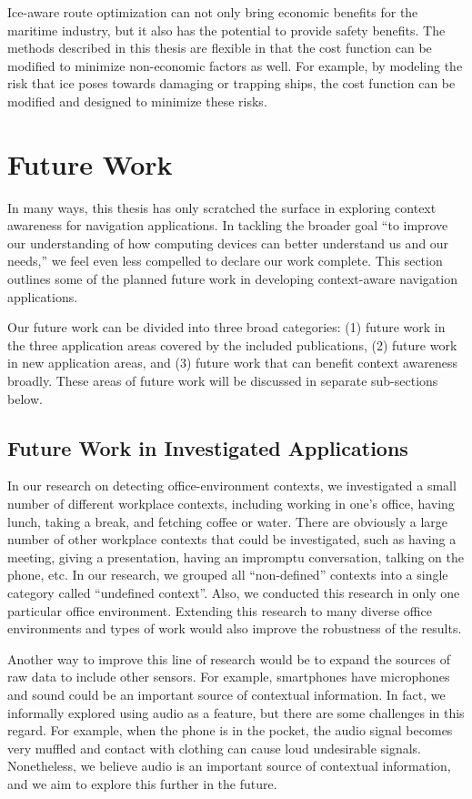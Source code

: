 Ice-aware route optimization can not only bring economic benefits for the maritime industry, but it also has the potential to provide safety benefits. The methods described in this thesis are flexible in that the cost function can be modified to minimize non-economic factors as well. For example, by modeling the risk that ice poses towards damaging or trapping ships, the cost function can be modified and designed to minimize these risks.

\section{Future Work}
\label{sec:future_work}

In many ways, this thesis has only scratched the surface in exploring context awareness for navigation applications. In tackling the broader goal ``to improve our understanding of how computing devices can better understand us and our needs,'' we feel even less compelled to declare our work complete. This section outlines some of the planned future work in developing context-aware navigation applications.

Our future work can be divided into three broad categories: (1) future work in the three application areas covered by the included publications, (2) future work in new application areas, and (3) future work that can benefit context awareness broadly. These areas of future work will be discussed in separate sub-sections below.
%
\subsection{Future Work in Investigated Applications}
\label{sec:future_applications}

In our research on detecting office-environment contexts, we investigated a small number of different workplace contexts, including working in one's office, having lunch, taking a break, and fetching coffee or water. There are obviously a large number of other workplace contexts that could be investigated, such as having a meeting, giving a presentation, having an impromptu conversation, talking on the phone, etc. In our research, we grouped all ``non-defined'' contexts into a single category called ``undefined context''. Also, we conducted this research in only one particular office environment. Extending this research to many diverse office environments and types of work would also improve the robustness of the results.

Another way to improve this line of research would be to expand the sources of raw data to include other sensors. For example, smartphones have microphones and sound could be an important source of contextual information. In fact, we informally explored using audio as a feature, but there are some challenges in this regard. For example, when the phone is in the pocket, the audio signal becomes very muffled and contact with clothing can cause loud undesirable signals. Nonetheless, we believe audio is an important source of contextual information, and we aim to explore this further in the future.

